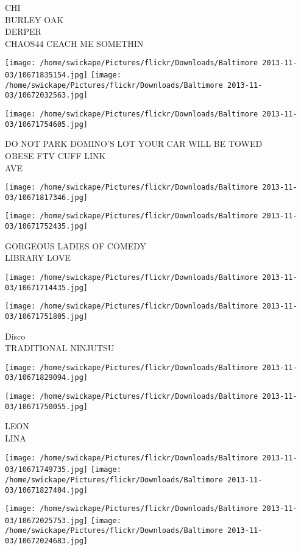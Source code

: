\documentclass[10pt,letterpaper]{article}
\begin{document}
CHI\\
BURLEY OAK\\
DERPER\\
CHAOS44 CEACH ME SOMETHIN
\pagebreak

\texttt{[image: /home/swickape/Pictures/flickr/Downloads/Baltimore 2013-11-03/10671835154.jpg]}
\texttt{[image: /home/swickape/Pictures/flickr/Downloads/Baltimore 2013-11-03/10672032563.jpg]}

\texttt{[image: /home/swickape/Pictures/flickr/Downloads/Baltimore 2013-11-03/10671754605.jpg]}

DO NOT PARK DOMINO'S LOT YOUR CAR WILL BE TOWED\\
OBESE FTV CUFF LINK\\
AVE
\pagebreak

\texttt{[image: /home/swickape/Pictures/flickr/Downloads/Baltimore 2013-11-03/10671817346.jpg]}

\vspace{0.25in}
\texttt{[image: /home/swickape/Pictures/flickr/Downloads/Baltimore 2013-11-03/10671752435.jpg]}

GORGEOUS LADIES OF COMEDY\\
LIBRARY LOVE
\pagebreak

\texttt{[image: /home/swickape/Pictures/flickr/Downloads/Baltimore 2013-11-03/10671714435.jpg]}

\vspace{0.25in}
\texttt{[image: /home/swickape/Pictures/flickr/Downloads/Baltimore 2013-11-03/10671751805.jpg]}

Disco\\
TRADITIONAL NINJUTSU
\pagebreak

\texttt{[image: /home/swickape/Pictures/flickr/Downloads/Baltimore 2013-11-03/10671829094.jpg]}

\vspace{0.25in}
\texttt{[image: /home/swickape/Pictures/flickr/Downloads/Baltimore 2013-11-03/10671750055.jpg]}

LEON\\
LINA
\pagebreak

\texttt{[image: /home/swickape/Pictures/flickr/Downloads/Baltimore 2013-11-03/10671749735.jpg]}
\texttt{[image: /home/swickape/Pictures/flickr/Downloads/Baltimore 2013-11-03/10671827404.jpg]}

\texttt{[image: /home/swickape/Pictures/flickr/Downloads/Baltimore 2013-11-03/10672025753.jpg]}
\texttt{[image: /home/swickape/Pictures/flickr/Downloads/Baltimore 2013-11-03/10672024683.jpg]}
\end{document}
